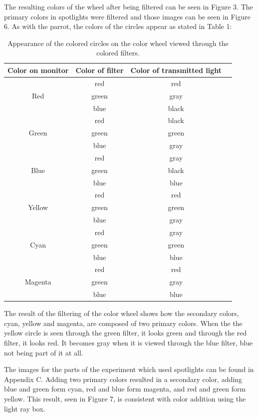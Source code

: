 \documentclass[twoside]{article}
\begin{document}
The resulting colors of the wheel after being filtered can be seen in Figure 3. The primary colors in spotlights were filtered and those images can be seen in Figure 6. As with the parrot, the colors of the circles appear as stated in Table 1:

\captionsetup[table]{width=4in}
\begin{table}[h!]
\centering
\caption{Appearance of the colored circles on the color wheel viewed through the colored filters.}
\begin{tabular}{ |c|c|c|c| } 
\hline
Color on monitor & Color of filter & Color of transmitted light \\
\hline
\multirow{3}{4em}{Red} & red & red \\ 
					   & green & gray \\ 
					   & blue & black \\ 
\hline
\multirow{3}{4em}{Green} & red & black \\ 
					     & green & green \\ 
					     & blue & gray \\ 
\hline
\multirow{3}{4em}{Blue} & red & gray \\ 
					    & green & black \\ 
					    & blue & blue \\ 
\hline
\multirow{3}{4em}{Yellow} & red & red \\ 
					      & green & green \\ 
					      & blue & gray \\ 
\hline
\multirow{3}{4em}{Cyan} & red & gray \\ 
					    & green & green \\ 
					    & blue & blue \\ 
\hline
\multirow{3}{4em}{Magenta} & red & red \\ 
					       & green & gray \\ 
					       & blue & blue \\ 
\hline
\end{tabular}
\label{tab:mytab}
\end{table}

The result of the filtering of the color wheel shows how the secondary colors, cyan, yellow and magenta, are composed of two primary colors. When the the yellow circle is seen through the green filter, it looks green and through the red filter, it looks red. It becomes gray when it is viewed through the blue filter, blue not being part of it at all.

The images for the parts of the experiment which used spotlights can be found in Appendix C. Adding two primary colors resulted in a secondary color, adding blue and green form cyan, red and blue form magenta, and red and green form yellow. This result, seen in Figure 7, is consistent with color addition using the light ray box.
\end{document}
